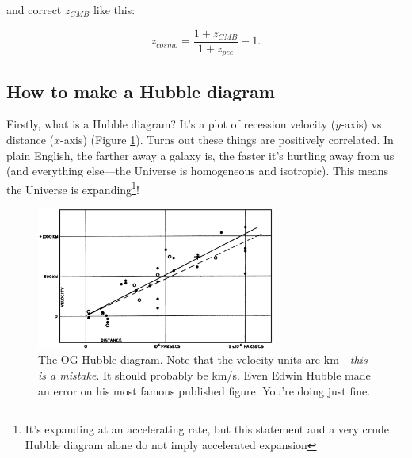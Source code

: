 and correct $z_{CMB}$ like this:

\begin{equation}
\label{eqn:vpeccorrection}
    z_{cosmo} = \frac{1 + z_{CMB}}{1 + z_{pec}} - 1.
\end{equation}

\subsection{How to make a Hubble diagram}
Firstly, what is a Hubble diagram? It's a plot of recession velocity ($y$-axis) vs. distance ($x$-axis) (Figure \ref{fig:oghubble}). Turns out these things are positively correlated. In plain English, the farther away a galaxy is, the faster it's hurtling away from us (and everything else---the Universe is homogeneous and isotropic). This means the Universe is expanding\footnote{It's expanding at an accelerating rate, but this statement and a very crude Hubble diagram alone do not imply accelerated expansion}!

\begin{figure}[h!]
    \centering
    \includegraphics[width=0.7\textwidth]{figs/hubble_diagram_og.jpeg}
    \caption{The OG Hubble diagram. Note that the velocity units are km---\textit{this is a mistake}. It should probably be km/s. Even Edwin Hubble made an error on his most famous published figure. You're doing just fine.}
    \label{fig:oghubble}
\end{figure}

